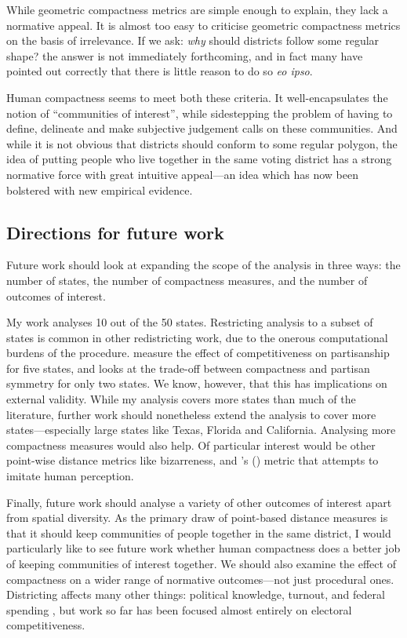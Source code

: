 \documentclass[]{article}
\begin{document}
While geometric compactness metrics are simple enough to explain, they
lack a normative appeal. It is almost too easy to criticise geometric
compactness metrics on the basis of irrelevance. If we ask: \emph{why}
should districts follow some regular shape? the answer is not
immediately forthcoming, and in fact many have pointed out correctly
that there is little reason to do so \emph{eo ipso}.

Human compactness seems to meet both these criteria. It
well-encapsulates the notion of ``communities of interest'', while
sidestepping the problem of having to define, delineate and make
subjective judgement calls on these communities. And while it is not
obvious that districts should conform to some regular polygon, the idea
of putting people who live together in the same voting district has a
strong normative force with great intuitive appeal---an idea which has
now been bolstered with new empirical evidence.

\hypertarget{directions-for-future-work}{%
\subsection{Directions for future
work}\label{directions-for-future-work}}

Future work should look at expanding the scope of the analysis in three
ways: the number of states, the number of compactness measures, and the
number of outcomes of interest.

My work analyses 10 out of the 50 states. Restricting analysis to a
subset of states is common in other redistricting work, due to the
onerous computational burdens of the procedure. \cite{ddj2019comp}
measure the effect of competitiveness on partisanship for five states,
and \cite{s2020} looks at the trade-off between compactness and partisan
symmetry for only two states. We know, however, that this has
implications on external validity. While my analysis covers more states
than much of the literature, further work should nonetheless extend the
analysis to cover more states---especially large states like Texas,
Florida and California. Analysing more compactness measures would also
help. Of particular interest would be other point-wise distance metrics
like bizarreness, and \citeauthor{kingwp}'s (\citeyear{kingwp}) metric
that attempts to imitate human perception.

Finally, future work should analyse a variety of other outcomes of
interest apart from spatial diversity. As the primary draw of
point-based distance measures is that it should keep communities of
people together in the same district, I would particularly like to see
future work whether human compactness does a better job of keeping
communities of interest together. We should also examine the effect of
compactness on a wider range of normative outcomes---not just procedural
ones. Districting affects many other things: political knowledge,
turnout, and federal spending \citep{snyder2010}, but work so far has
been focused almost entirely on electoral competitiveness.
\end{document}
